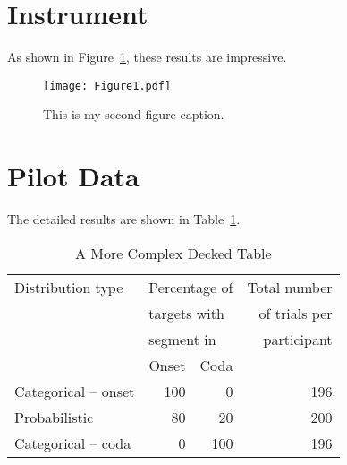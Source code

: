\documentclass[stu]{apa7}
\begin{document}
\appendix

\section{Instrument}
\label{app:instrument}

As shown in Figure~\ref{fig:Figure2}, these results are impressive. \lipsum[20]

\begin{figure}
	\caption{This is my second figure caption.}
	\texttt{[image: Figure1.pdf]}
	\label{fig:Figure2}
\end{figure}

\lipsum[21]
\section{Pilot Data}
\label{app:surveydata}

The detailed results are shown in Table~\ref{tab:DeckedTable}. \lipsum[22]

\begin{table}
	\begin{threeparttable}
		\caption{A More Complex Decked Table}
		\label{tab:DeckedTable}
		\begin{tabular}{@{}lrrr@{}}         \toprule
			Distribution type              & \multicolumn{2}{l}{Percentage of} & Total number        \\
			                               & \multicolumn{2}{l}{targets with}  & of trials per       \\
			                               & \multicolumn{2}{l}{segment in}    & participant         \\ \cmidrule(r){2-3}
			                               & Onset                             & Coda          &     \\ \midrule
			Categorical -- onset\tabfnm{a} & 100                               & 0             & 196 \\
			Probabilistic                  & 80                                & 20\tabfnm{*}  & 200 \\
			Categorical -- coda\tabfnm{b}  & 0                                 & 100\tabfnm{*} & 196 \\ \midrule
		\end{tabular}
	\end{threeparttable}
\end{table}

\lipsum[23]
\end{document}
